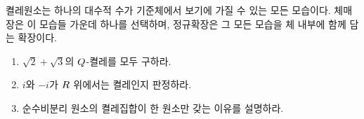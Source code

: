 \begin{keyidea}
켤레원소는 하나의 대수적 수가 기준체에서 보기에 가질 수 있는 모든 모습이다. 체매장은 이 모습들 가운데 하나를 선택하며, 정규확장은 그 모든 모습을 체 내부에 함께 담는 확장이다.
\end{keyidea}

\begin{checkpoint}
\begin{enumerate}[label=(\alph*)]
  \item $\sqrt2+\sqrt3$의 $Q$-켤레를 모두 구하라.
  \item $i$와 $-i$가 $R$ 위에서는 켤레인지 판정하라.
  \item 순수비분리 원소의 켤레집합이 한 원소만 갖는 이유를 설명하라.
\end{enumerate}
\end{checkpoint}
